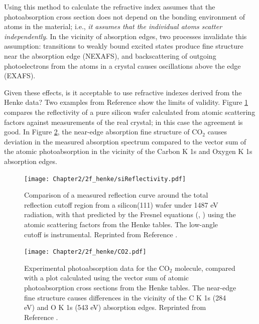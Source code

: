 Using this method to calculate the refractive index assumes that the photoabsorption cross section does not depend on the bonding environment of atoms in the material; i.e., \emph{it assumes that the individual atoms scatter independently}.  In the vicinity of absorption edges, two processes invalidate this assumption: transitions to weakly bound excited states produce fine structure near the absorption edge (NEXAFS), and backscattering of outgoing photoelectrons from the atoms in a crystal causes oscillations above the edge (EXAFS).

Given these effects, is it acceptable to use refractive indexes derived from the Henke data?  Two examples from Reference \cite{Hen93} show the limits of validity.  Figure \ref{henkeValid1} compares the reflectivity of a pure silicon wafer calculated from atomic scattering factors against measurements of the real crystal; in this case the agreement is good.  In Figure \ref{henkeValid2}, the near-edge absorption fine structure of CO$_2$ causes deviation in the measured absorption spectrum compared to the vector sum of the atomic photoabsorption in the vicinity of the Carbon K 1s and Oxygen K 1s absorption edges.

\begin{figure}[htbp] %
   \centering
   \texttt{[image: Chapter2/2f\_henke/siReflectivity.pdf]} 
   \caption[Comparison of a measured reflection curve around the total reflection cutoff region from a silicon(111) wafer under 1487 eV radiation, with that predicted by the Fresnel equations using atomic scattering factors from the Henke tables.]{Comparison of a measured reflection curve around the total reflection cutoff region from a silicon(111) wafer under 1487 eV radiation, with that predicted by the Fresnel equations (\protect {}, \protect {}) using the atomic scattering factors from the Henke tables.  The low-angle cutoff is instrumental. Reprinted from Reference \protect \cite[Figure 18]{Hen93}.}
   \label{henkeValid1}
\end{figure}
\begin{figure}[htbp] %
   \centering
   \texttt{[image: Chapter2/2f\_henke/CO2.pdf]} 
   \caption[Experimental photoabsorption data for the CO$_2$ molecule, compared with a plot calculated using the vector sum of atomic photoabsorption cross sections from the Henke tables.]{Experimental photoabsorption data for the CO$_2$ molecule, compared with a plot calculated using the vector sum of atomic photoabsorption cross sections from the Henke tables. The near-edge fine structure causes differences in the vicinity of the C K 1s (284 eV) and O K 1s (543 eV) absorption edges.  Reprinted from Reference \protect \cite[Figure 15]{Hen93}.}
   \label{henkeValid2}
\end{figure}

